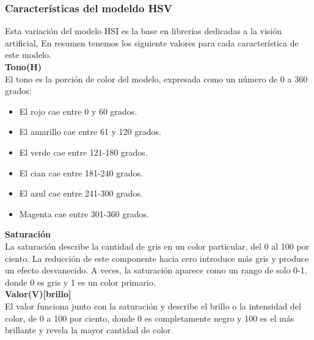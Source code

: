 \subsubsection{Características del modeldo HSV}
Esta variación del modelo HSI es la base en librerias dedicadas a la visión artificial,
En resumen tenemos los siguiente valores para cada característica de este modelo.\\
\textbf{Tono(H)}\\
El tono es la porción de color del modelo, expresada como un número de 0 a 360 grados:
\begin{itemize}
	\item El rojo cae entre 0 y 60 grados.
	\item El amarillo cae entre 61 y 120 grados.
	\item El verde cae entre 121-180 grados.
	\item El cian cae entre 181-240 grados.
	\item El azul cae entre 241-300 grados.
	\item Magenta cae entre 301-360 grados.
\end{itemize}
\textbf{Saturación}\\
La saturación describe la cantidad de gris en un color particular, del 0 al 100 por
ciento. La reducción de este componente hacia cero introduce más gris y produce un
efecto desvanecido. A veces, la saturación aparece como un rango de solo 0-1, donde 0
es gris y 1 es un color primario.\\
\textbf{Valor(V)[brillo]}\\
El valor funciona junto con la saturación y describe el brillo o la intensidad del
color, de 0 a 100 por ciento, donde 0 es completamente negro y 100 es el más brillante
y revela la mayor cantidad de color.

